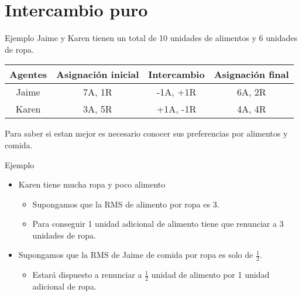 \section[Intercambio]{Intercambio puro}

\begin{frame}{Ejemplo}
	Jaime y Karen tienen un total de 10 unidades de alimentos y 6 unidades de ropa.
	\begin{table}
		\begin{tabular}{|c|c|c|c|}
			\hline
			Agentes & Asignación inicial & Intercambio & Asignación final \\
			\hline
			Jaime & 7A, 1R & -1A, +1R & 6A, 2R\\
			\hline
			Karen & 3A, 5R & +1A, -1R & 4A, 4R\\
			\hline
		\end{tabular}
	\end{table}
	Para saber si estan mejor es necesario conocer sus preferencias por alimentos y comida.
\end{frame}
\begin{frame}{Ejemplo}
	\begin{itemize}
		\item Karen tiene mucha ropa y poco alimento
		\begin{itemize}
			\item Supongamos que la RMS de alimento por ropa es 3.
			\item Para conseguir 1 unidad adicional de alimento tiene que renunciar a 3 unidades de ropa.
		\end{itemize}
		\item Supongamos que la RMS de Jaime de comida por ropa es solo de $\frac{1}{2}$.
		\begin{itemize}
			\item Estará dispuesto a renunciar a $\frac{1}{2}$ unidad de alimento por 1 unidad adicional de ropa.
		\end{itemize}
	\end{itemize}
\end{frame}
